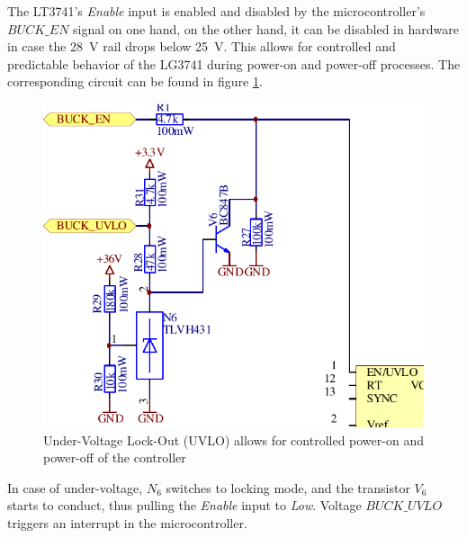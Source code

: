 The   LT3741's  \emph{Enable}   input   is  enabled   and   disabled  by   the
microcontroller's  $BUCK\_EN$  signal on  one  hand,  on  the other  hand,  it
can  be disabled  in  hardware in  case the  \SI{28}{\volt}  rail drops  below
\SI{25}{\volt}. This  allows for  controlled and  predictable behavior  of the
LG3741 during power-on and  power-off processes. The corresponding circuit can
be found in figure \ref{fig:circuit:uvlo}.

\begin{figure}[th!]
    \center
    \includegraphics[width=.6\textwidth]{images/circuit/uvlo.pdf}
    \caption{Under-Voltage Lock-Out (UVLO) allows for controlled power-on and power-off of the controller}
    \label{fig:circuit:uvlo}
\end{figure}

In  case   of  under-voltage,  $N_6$   switches  to  locking  mode,   and  the
transistor $V_6$  starts to conduct,  thus pulling the \emph{Enable}  input to
\emph{Low}. Voltage $BUCK\_UVLO$ triggers an interrupt in the microcontroller.
